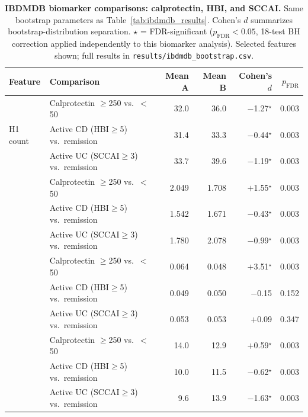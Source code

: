 \begin{table}[H]
\centering
\caption{%
  \textbf{IBDMDB biomarker comparisons: calprotectin, HBI, and SCCAI.}
  Same bootstrap parameters as Table~\ref{tab:ibdmdb_results}.
  Cohen's $d$ summarizes bootstrap-distribution separation.
  $\star$ = FDR-significant ($p_\text{FDR} < 0.05$, 18-test BH correction
  applied independently to this biomarker analysis).
  Selected features shown; full results in \texttt{results/ibdmdb\_bootstrap.csv}.
}
\label{tab:ibdmdb_biomarkers}
\small
\setlength{\tabcolsep}{4pt}
\begin{tabular}{llrrrr}
\toprule
\textbf{Feature} & \textbf{Comparison}
  & \textbf{Mean A} & \textbf{Mean B}
  & \textbf{Cohen's $d$} & \boldmath$p_\text{FDR}$ \\
\midrule
\multirow{3}{*}{H1 count}
  & Calprotectin $\geq$250 vs.\ $<$50 & 32.0 & 36.0 & $-$1.27$^\star$ & 0.003 \\
  & Active CD (HBI$\geq$5) vs.\ remission & 31.4 & 33.3 & $-$0.44$^\star$ & 0.003 \\
  & Active UC (SCCAI$\geq$3) vs.\ remission & 33.7 & 39.6 & $-$1.19$^\star$ & 0.003 \\
\addlinespace
\multirow{3}{*}{Total persistence}
  & Calprotectin $\geq$250 vs.\ $<$50 & 2.049 & 1.708 & $+$1.55$^\star$ & 0.003 \\
  & Active CD (HBI$\geq$5) vs.\ remission & 1.542 & 1.671 & $-$0.43$^\star$ & 0.003 \\
  & Active UC (SCCAI$\geq$3) vs.\ remission & 1.780 & 2.078 & $-$0.99$^\star$ & 0.003 \\
\addlinespace
\multirow{3}{*}{Mean lifetime}
  & Calprotectin $\geq$250 vs.\ $<$50 & 0.064 & 0.048 & $+$3.51$^\star$ & 0.003 \\
  & Active CD (HBI$\geq$5) vs.\ remission & 0.049 & 0.050 & $-$0.15         & 0.152 \\
  & Active UC (SCCAI$\geq$3) vs.\ remission & 0.053 & 0.053 & $+$0.09         & 0.347 \\
\addlinespace
\multirow{3}{*}{Max Betti-1}
  & Calprotectin $\geq$250 vs.\ $<$50 & 14.0 & 12.9 & $+$0.59$^\star$ & 0.003 \\
  & Active CD (HBI$\geq$5) vs.\ remission & 10.0 & 11.5 & $-$0.62$^\star$ & 0.003 \\
  & Active UC (SCCAI$\geq$3) vs.\ remission &  9.6 & 13.9 & $-$1.63$^\star$ & 0.003 \\
\bottomrule
\end{tabular}
\end{table}

